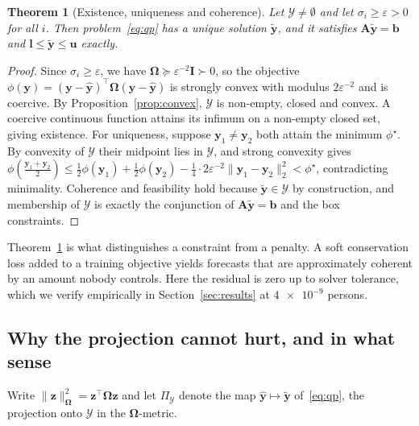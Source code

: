 \documentclass[11pt]{article}
\theoremstyle{plain}
\newtheorem{theorem}{Theorem}
\theoremstyle{definition}
\theoremstyle{remark}
\newcommand{\bA}{\bm{A}}
\newcommand{\by}{\bm{y}}
\newcommand{\bb}{\bm{b}}
\newcommand{\bOm}{\bm{\Omega}}
\newcommand{\yhat}{\hat{\by}}
\newcommand{\ytil}{\tilde{\by}}
\newcommand{\cY}{\mathcal{Y}}
\begin{document}
\begin{theorem}[Existence, uniqueness and coherence]
\label{thm:unique}
Let $\cY \ne \emptyset$ and let $\sigma_i \ge \varepsilon > 0$ for all $i$. Then problem~\eqref{eq:qp} has a unique solution $\ytil$, and it satisfies $\bA\ytil = \bb$ and $\bm{l}\le\ytil\le\bm{u}$ exactly.
\end{theorem}
\begin{proof}
Since $\sigma_i \ge \varepsilon$, we have $\bOm \succeq \varepsilon^{-2}\bm{I} \succ 0$, so the objective $\phi(\by) = (\by-\yhat)^{\top}\bOm(\by-\yhat)$ is strongly convex with modulus $2\varepsilon^{-2}$ and is coercive. By Proposition~\ref{prop:convex}, $\cY$ is non-empty, closed and convex. A coercive continuous function attains its infimum on a non-empty closed set, giving existence. For uniqueness, suppose $\by_1 \ne \by_2$ both attain the minimum $\phi^\star$. By convexity of $\cY$ their midpoint lies in $\cY$, and strong convexity gives
$\phi\!\left(\tfrac{\by_1+\by_2}{2}\right) \le \tfrac{1}{2}\phi(\by_1) + \tfrac{1}{2}\phi(\by_2) - \tfrac{1}{4}\cdot 2\varepsilon^{-2}\|\by_1-\by_2\|_2^2 < \phi^\star$,
contradicting minimality. Coherence and feasibility hold because $\ytil \in \cY$ by construction, and membership of $\cY$ is exactly the conjunction of $\bA\ytil=\bb$ and the box constraints.
\end{proof}

Theorem~\ref{thm:unique} is what distinguishes a constraint from a penalty. A soft conservation loss added to a training objective yields forecasts that are approximately coherent by an amount nobody controls. Here the residual is zero up to solver tolerance, which we verify empirically in Section~\ref{sec:results} at $\num{4e-9}$ persons.

\subsection{Why the projection cannot hurt, and in what sense}

Write $\|\bm{z}\|_{\bOm}^2 = \bm{z}^{\top}\bOm\bm{z}$ and let $\Pi_{\cY}$ denote the map $\yhat \mapsto \ytil$ of~\eqref{eq:qp}, the projection onto $\cY$ in the $\bOm$-metric.
\end{document}

